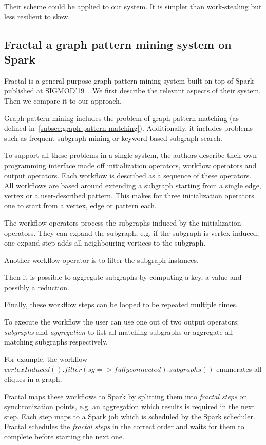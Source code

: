 Their scheme could be applied to our system.
It is simpler than work-stealing but less resilient to skew.

\subsection{Fractal a graph pattern mining system on Spark} \label{subsec:fractal}
Fractal is a general-purpose graph pattern mining system built on top of Spark published at SIGMOD'19~\cite{fractal}.
We first describe the relevant aspects of their system.
Then we compare it to our approach.

Graph pattern mining includes the problem of graph pattern matching (as defined in~\cref{subsec:graph-pattern-matching}).
Additionally, it includes problems such as frequent subgraph mining or keyword-based subgraph search.

To support all these problems in a single system, the authors describe their own programming interface made
off initialization operators, workflow operators and output operators.
Each workflow is described as a sequence of these operators.
All workflows are based around extending a subgraph starting from a single edge, vertex or a user-described
pattern.
This makes for three initialization operators one to start from a vertex, edge or pattern each.

The workflow operators process the subgraphs induced by the initialization operators.
They can expand the subgraph, e.g. if the subgraph is vertex induced, one expand step adds all neighbouring
vertices to the subgraph.

Another workflow operator is to filter the subgraph instances.

Then it is possible to aggregate subgraphs by computing a key, a value and possibly a reduction.

Finally, these workflow steps can be looped to be repeated multiple times.

To execute the workflow the user can use one out of two output operators: \textit{subgraphs} and
\textit{aggregation} to list all matching subgraphs or aggregate all matching subgraphs respectively.

For example, the workflow $vertexInduced().filter(sg => fully connected).subgraphs()$ enumerates
all cliques in a graph.

Fractal maps these workflows to Spark by splitting them into \textit{fractal steps} on
synchronization points, e.g. an aggregation which results is required in the next step.
Each step maps to a Spark job which is scheduled by the Spark scheduler.
Fractal schedules the \textit{fractal steps} in the correct order and waits for them to complete
before starting the next one.

